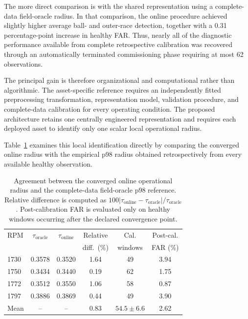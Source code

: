 \documentclass{trbunofficial}
\begin{document}
The more direct comparison is with the shared representation using a
complete-data field-oracle radius. In that comparison, the online procedure
achieved slightly higher average ball- and outer-race detection, together
with a 0.31 percentage-point increase in healthy FAR. Thus, nearly all of
the diagnostic performance available from complete retrospective
calibration was recovered through an automatically terminated commissioning
phase requiring at most 62 observations.

The principal gain is therefore organizational and computational rather
than algorithmic. The asset-specific reference requires an independently
fitted preprocessing transformation, representation model, validation
procedure, and complete-data calibration for every operating condition.
The proposed architecture retains one centrally engineered representation
and requires each deployed asset to identify only one scalar local
operational radius.

Table~\ref{tab:online-oracle-agreement} examines this local identification
directly by comparing the converged online radius with the empirical p98
radius obtained retrospectively from every available healthy observation.

\begin{table}[!ht]
\centering
\caption{Agreement between the converged online operational radius and the
complete-data field-oracle p98 reference. Relative difference is computed as
$100|\tau_{\mathrm{online}}-\tau_{\mathrm{oracle}}|/
\tau_{\mathrm{oracle}}$. Post-calibration FAR is evaluated only on healthy
windows occurring after the declared convergence point.}
\label{tab:online-oracle-agreement}
\begin{tabular}{@{}lccccc@{}}
\toprule
RPM & $\tau_{\mathrm{oracle}}$ & $\tau_{\mathrm{online}}$ & Relative & Cal.    & Post-cal. \\
    &                          &                          & diff.\ (\%) & windows & FAR (\%)  \\
\midrule
1730 & 0.3578 & 0.3520 & 1.64 & 49 & 3.94 \\
1750 & 0.3434 & 0.3440 & 0.19 & 62 & 1.75 \\
1772 & 0.3512 & 0.3550 & 1.06 & 58 & 0.87 \\
1797 & 0.3886 & 0.3869 & 0.44 & 49 & 3.90 \\
\midrule
Mean & --     & --     & 0.83 & $54.5 \pm 6.6$ & 2.62 \\
\bottomrule
\end{tabular}
\end{table}
\end{document}
